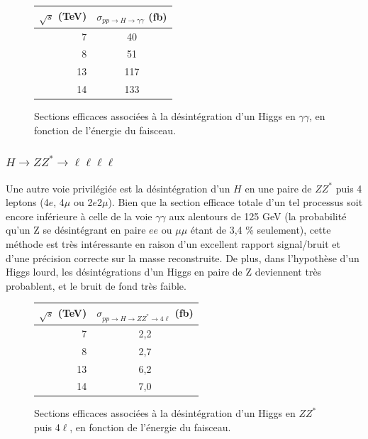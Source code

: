 \documentclass[11pt]{article} %
\begin{document}
\begin{figure}[H]
\centering
\begin{tabular}{|r|c|} 
   \hline
   $\sqrt{s}$ (TeV) & $\sigma_{pp \to H \to \gamma \gamma}$ (fb) \\
    \hline
   7 &  40\\
\hline
   8 & 51 \\
\hline
   13 & 117  \\
\hline
   14 & 133 \\
  \hline
\end{tabular}
\caption{Sections efficaces associées à la désintégration d'un Higgs en $\gamma \gamma$, en fonction de l'énergie du faisceau.}
\end{figure}



\subsubsection{$H \to ZZ^* \to \ell \ell \ell \ell$}

Une autre voie privilégiée est la désintégration d'un $H$ en une paire de $ZZ^*$ puis 4 leptons (4$e$, 4$\mu$ ou 2$e$2$\mu$). Bien que la section efficace totale d'un tel processus soit encore inférieure à celle de la voie $\gamma \gamma$ aux alentours de 125 GeV  (la probabilité qu'un Z se désintégrant en paire $ee$ ou $\mu \mu$ étant de 3,4 \% seulement), cette méthode est très intéressante en raison d'un excellent rapport signal/bruit et d'une précision correcte sur la masse reconstruite. De plus, dans l'hypothèse d'un Higgs lourd, les désintégrations d'un Higgs en paire de Z deviennent très probablent, et le bruit de fond très faible.

\begin{figure}[H]
\centering
\begin{tabular}{|r|c|} 
   \hline
   $\sqrt{s}$ (TeV) & $\sigma_{pp \to H \to ZZ^* \to 4\ell}$ (fb) \\
    \hline
   7 &  2,2\\
\hline
   8 & 2,7 \\
\hline
   13 & 6,2  \\
\hline
   14 & 7,0 \\
  \hline
\end{tabular}
\caption{Sections efficaces associées à la désintégration d'un Higgs en $ZZ^*$ puis 4$\ell$, en fonction de l'énergie du faisceau.}
\end{figure}
\end{document}
